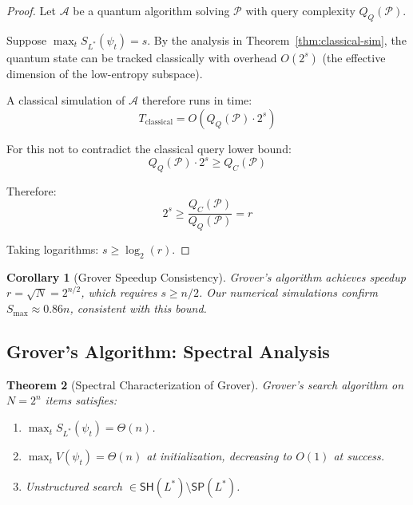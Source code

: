 \documentclass[11pt,a4paper]{article}
\theoremstyle{plain}
\newtheorem{theorem}{Theorem}[section]
\newtheorem{corollary}[theorem]{Corollary}
\theoremstyle{definition}
\theoremstyle{remark}
\newcommand{\SH}{\mathsf{SH}}
\newcommand{\SP}{\mathsf{SP}}
\begin{document}
\begin{proof}
Let $\mathcal{A}$ be a quantum algorithm solving $\mathcal{P}$ with query complexity $Q_Q(\mathcal{P})$.

Suppose $\max_t S_{L^*}(\psi_t) = s$. By the analysis in Theorem~\ref{thm:classical-sim}, the quantum state can be tracked classically with overhead $O(2^s)$ (the effective dimension of the low-entropy subspace).

A classical simulation of $\mathcal{A}$ therefore runs in time:
\begin{equation}
    T_{\text{classical}} = O(Q_Q(\mathcal{P}) \cdot 2^s)
\end{equation}

For this not to contradict the classical query lower bound:
\begin{equation}
    Q_Q(\mathcal{P}) \cdot 2^s \geq Q_C(\mathcal{P})
\end{equation}

Therefore:
\begin{equation}
    2^s \geq \frac{Q_C(\mathcal{P})}{Q_Q(\mathcal{P})} = r
\end{equation}

Taking logarithms: $s \geq \log_2(r)$.
\end{proof}

\begin{corollary}[Grover Speedup Consistency]
Grover's algorithm achieves speedup $r = \sqrt{N} = 2^{n/2}$, which requires $s \geq n/2$. Our numerical simulations confirm $S_{\max} \approx 0.86n$, consistent with this bound.
\end{corollary}

\subsection{Grover's Algorithm: Spectral Analysis}

\begin{theorem}[Spectral Characterization of Grover]\label{thm:grover}
Grover's search algorithm on $N = 2^n$ items satisfies:
\begin{enumerate}[label=(\roman*),noitemsep]
    \item $\max_t S_{L^*}(\psi_t) = \Theta(n)$.
    \item $\max_t V(\psi_t) = \Theta(n)$ at initialization, decreasing to $O(1)$ at success.
    \item Unstructured search $\in \SH(L^*) \setminus \SP(L^*)$.
\end{enumerate}
\end{theorem}
\end{document}
